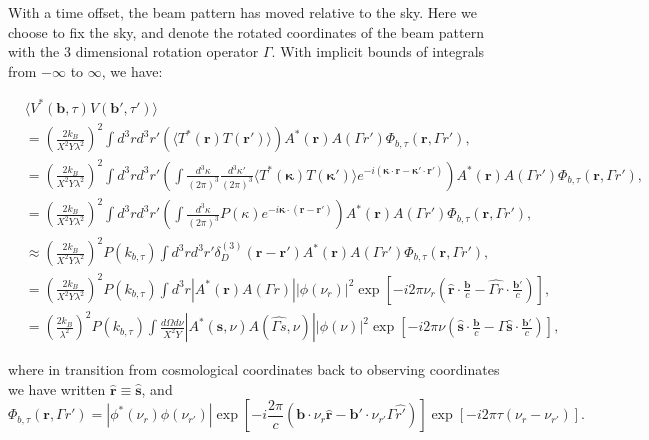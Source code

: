 \documentclass[twocolumn,apj,numberedappendix]{emulateapj}
\renewcommand\[{\begin{equation}}
\renewcommand\]{\end{equation}}
\begin{document}
With a time offset, the beam pattern has moved relative to the sky.
Here we choose to fix the sky, and denote the rotated coordinates
of the beam pattern with the 3 dimensional rotation operator $\Gamma$. With implicit bounds
of integrals from $-\infty$ to $\infty$, we have:
\begin{widetext}
\begin{equation}
\begin{aligned} & \langle V^{*}(\boldsymbol{b},\tau)V(\boldsymbol{b'},\tau')\rangle\\
 & =\left(\frac{2k_{B}}{X^{2}Y\lambda^{2}}\right)^{2}\int d^{3}rd^{3}r'\left(\langle T^{*}(\boldsymbol{r})T(\boldsymbol{r'})\rangle\right)A^{*}(\boldsymbol{r})A(\Gamma r')\Phi_{b,\tau}(\boldsymbol{r},\Gamma r'),\\
 & =\left(\frac{2k_{B}}{X^{2}Y\lambda^{2}}\right)^{2}\int d^{3}rd^{3}r'\left(\int\frac{d^{3}\kappa}{(2\pi)^{3}}\frac{d^{3}\kappa'}{(2\pi)^{3}}\langle T^{*}(\boldsymbol{\kappa})T(\boldsymbol{\kappa'})\rangle e^{-i(\boldsymbol{\kappa}\cdot \boldsymbol{r}-\boldsymbol{\kappa'}\cdot\boldsymbol{r'})}\right)A^{*}(\boldsymbol{r})A(\Gamma r')\Phi_{b,\tau}(\boldsymbol{r},\Gamma r'),\\
 & =\left(\frac{2k_{B}}{X^{2}Y\lambda^{2}}\right)^{2}\int d^{3}rd^{3}r'\left(\int\frac{d^{3}\kappa}{(2\pi)^{3}}P(\kappa)e^{-i\boldsymbol{\kappa}\cdot(\boldsymbol{r}-\boldsymbol{r'})}\right)A^{*}(\boldsymbol{r})A(\Gamma r')\Phi_{b,\tau}(\boldsymbol{r},\Gamma r'),\\
 & \approx\left(\frac{2k_{B}}{X^{2}Y\lambda^{2}}\right)^{2}P(k_{b,\tau})\int d^{3}rd^{3}r'\delta_{D}^{(3)}(\boldsymbol{r}-\boldsymbol{r'})A^{*}(\boldsymbol{r})A(\Gamma r')\Phi_{b,\tau}(\boldsymbol{r},\Gamma r'),\\
 & =\left(\frac{2k_{B}}{X^{2}Y\lambda^{2}}\right)^{2}P(k_{b,\tau})\int d^{3}r|A^{*}(\boldsymbol{r})A(\Gamma r)||\phi(\nu_{r})|^{2}\exp\left[-i2\pi\nu_{r}\left(\hat{\boldsymbol{r}}\cdot\frac{\boldsymbol{b}}{c}-\hat{\Gamma r}\cdot\frac{\boldsymbol{b'}}{c}\right)\right],\\
 & =\left(\frac{2k_{B}}{\lambda^{2}}\right)^{2}P(k_{b,\tau})\int\frac{d\Omega d\nu}{X^{2}Y}|A^{*}(\hat{\boldsymbol{s}},\nu)A(\hat{\Gamma s},\nu)||\phi(\nu)|^{2}\exp\left[-i2\pi\nu\left(\hat{\boldsymbol{s}}\cdot\frac{\boldsymbol{b}}{c}-\Gamma\hat{\boldsymbol{s}}\cdot\frac{\boldsymbol{b'}}{c}\right)\right],
\end{aligned}
\label{eq:main}
\end{equation}

where in transition from cosmological coordinates back to observing coordinates we have written $\hat{\boldsymbol{r}}\equiv\hat{\boldsymbol{s}}$, and 
\begin{equation}
\Phi_{b,\tau}(\boldsymbol{r},\Gamma r')=|{\phi^{*}}(\ensuremath{\nu_{r}})\phi(\nu_{r'})|\exp\left[-i\frac{2\pi}{c}\left(\boldsymbol{b}\cdot\nu_{r}\hat{\boldsymbol{r}}-\boldsymbol{b'}\cdot\nu_{r'}\Gamma\hat{r'}\right)\right]\exp\left[-i2\pi\tau\left(\nu_{r}-\nu_{r'}\right)\right].
\end{equation}
\end{widetext}
\end{document}
